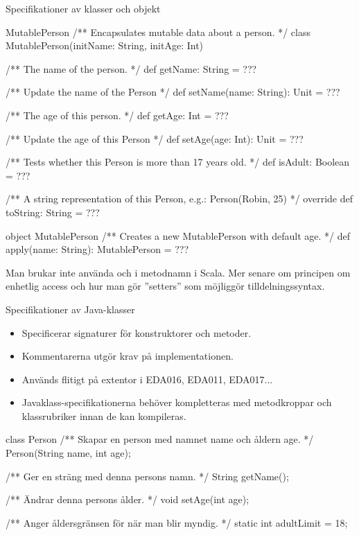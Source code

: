 \begin{Slide}{Specifikationer av klasser och objekt}
\begin{ScalaSpec}{MutablePerson}
/** Encapsulates mutable data about a person. */
class MutablePerson(initName: String, initAge: Int){
  /** The name of the person. */
  def getName: String = ???
  
  /** Update the name of the Person */
  def setName(name: String): Unit = ???

  /** The age of this person. */
  def getAge: Int = ???

  /** Update the age of this Person */
  def setAge(age: Int): Unit = ???

  /** Tests whether this Person is more than 17 years old. */
  def isAdult: Boolean = ???

  /** A string representation of this Person, e.g.: Person(Robin, 25) */
  override def toString: String = ???
}
object MutablePerson {
  /** Creates a new MutablePerson with default age. */
  def apply(name: String): MutablePerson = ???
}
\end{ScalaSpec}

\end{Slide}

\ifkompendium
Man brukar inte använda  och  i metodnamn i Scala. Mer senare om principen om enhetlig access  och hur man gör ''setters'' som möjliggör tilldelningssyntax.
\fi


\begin{Slide}{Specifikationer av Java-klasser}
\begin{itemize}\small
\item Specificerar signaturer för konstruktorer och metoder. 
\item Kommentarerna utgör krav på implementationen.  
\item Används flitigt på extentor i EDA016, EDA011, EDA017...
\item Javaklass-specifikationerna behöver kompletteras med metodkroppar och klassrubriker innan de kan kompileras.
\end{itemize}
\begin{JavaSpec}{class Person}
/** Skapar en person med namnet name och åldern age. */
Person(String name, int age);

/** Ger en sträng med denna persons namn. */
String getName();

/** Ändrar denna persons ålder. */
void setAge(int age);

/** Anger åldersgränsen för när man blir myndig. */
static int adultLimit = 18;
\end{JavaSpec}
\end{Slide}









